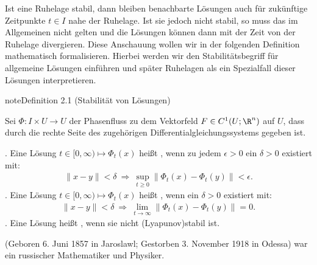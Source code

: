 \documentclass[letterpaper,10pt,german]{jupyterBook}
\begin{document}
\sphinxAtStartPar
Ist eine Ruhelage stabil, dann bleiben benachbarte Lösungen auch für zukünftige Zeitpunkte \(t \in I\) nahe der Ruhelage.
Ist sie jedoch nicht stabil, so muss das im Allgemeinen nicht gelten und die Lösungen können dann mit der Zeit von der Ruhelage divergieren.
Diese Anschauung wollen wir in der folgenden Definition mathematisch formalisieren.
Hierbei werden wir den Stabilitätsbegriff für allgemeine Lösungen einführen und später Ruhelagen als ein Spezialfall dieser Lösungen interpretieren.
\label{odestability/stabilitaetsbegriffe:def:Stabilitaet}
\begin{sphinxadmonition}{note}{Definition 2.1 (Stabilität von Lösungen)}



\sphinxAtStartPar
Sei \(\Phi \colon I \times U \rightarrow U\) der Phasenfluss zu dem Vektorfeld \(F\in C^1(U;\R^n)\) auf \(U\), dass durch die rechte Seite des zugehörigen Differentialgleichungssystems gegeben ist.

. Eine Lösung \(t \in [0,\infty) \mapsto \Phi_t(x)\) heißt , wenn zu jedem \(\epsilon > 0\) ein \(\delta>0\) existiert mit:
\begin{equation*}
\begin{split}\|x-y\|<\delta \ \Rightarrow \ \sup_{t\geq0}\|\Phi_t(x)-\Phi_t(y)\|<\epsilon.\end{split}
\end{equation*}
. Eine Lösung \( t \in [0,\infty) \mapsto \Phi_t(x)\) heißt , wenn ein \(\delta > 0\) existiert mit:
\begin{equation*}
\begin{split}\|x-y\|<\delta \ \Rightarrow \ \lim_{t\to\infty}\|\Phi_t(x)-\Phi_t(y)\|=0.\end{split}
\end{equation*}
. Eine Lösung heißt , wenn sie nicht (Lyapunov\sphinxhyphen{})stabil ist.
\end{sphinxadmonition}

\begin{sphinxShadowBox}

\sphinxAtStartPar
{} (Geboren 6. Juni 1857 in Jaroslawl; Gestorben 3. November 1918 in Odessa) war ein russischer Mathematiker und Physiker.
\end{sphinxShadowBox}
\end{document}
